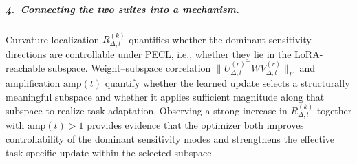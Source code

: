 \documentclass{article}
\theoremstyle{plain}
\theoremstyle{definition}
\theoremstyle{remark}
\begin{document}
\subparagraph{4.\ Connecting the two suites into a mechanism.}
Curvature localization $R_{\Delta,t}^{(k)}$ quantifies whether the dominant sensitivity directions are controllable under PECL, i.e., whether they lie in the LoRA-reachable subspace. Weight--subspace correlation $\|U_{\Delta,t}^{(r)\top} W V_{\Delta,t}^{(r)}\|_F$ and amplification $\mathrm{amp}(t)$ quantify whether the learned update selects a structurally meaningful subspace and whether it applies sufficient magnitude along that subspace to realize task adaptation. Observing a strong increase in $R_{\Delta,t}^{(k)}$ together with $\mathrm{amp}(t)>1$ provides evidence that the optimizer both improves controllability of the dominant sensitivity modes and strengthens the effective task-specific update within the selected subspace.
\end{document}
